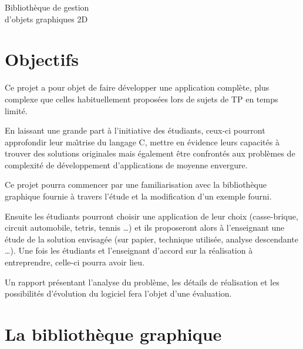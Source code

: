 \documentclass[12pt]{article}
\begin{document}
\begin{LARGE}
\begin{bf}
\begin{center}
Biblioth\`eque de gestion\\
d'objets graphiques 2D
\end{center}
\end{bf}
\end{LARGE}


\section{Objectifs}

\vspace{0.3cm}
Ce projet a pour objet de faire d\'evelopper une application
compl\`ete, plus complexe que celles habituellement propos\'ees lors de
sujets de TP en temps limit\'e.

\vspace{0.2cm}
En laissant une grande part \`a l'initiative
des \'etudiants, ceux-ci pourront approfondir leur ma{\^\i}trise
du langage C, mettre en \'evidence leurs capacit\'es \`a trouver des
solutions originales mais \'egalement \^etre confront\'es aux probl\`emes de
complexit\'e de d\'eveloppement d'applications de moyenne envergure.

\vspace{0.2cm}
Ce projet pourra commencer par une familiarisation avec la
biblioth\`eque graphi\-que fournie \`a travers l'\'etude et la modification
d'un exemple fourni.

\vspace{0.2cm}
Ensuite les \'etudiants pourront choisir une
application de leur choix (casse-brique, circuit automobile,
tetris, tennis \ldots) et ils proposeront alors \`a l'enseignant une \'etude
de la solution envisag\'ee (sur papier, technique utilis\'ee, analyse
descendante \ldots). Une fois les \'etudiants et l'enseignant d'accord
sur la r\'ealisation \`a entreprendre, celle-ci pourra avoir lieu.

\vspace{0.2cm}
Un rapport pr\'esentant l'analyse du probl\`eme, les d\'etails de
r\'ealisation et les possibilit\'es d'\'evolution du logiciel fera
l'objet d'une \'evaluation.


\section{La biblioth\`eque graphique}
\end{document}
